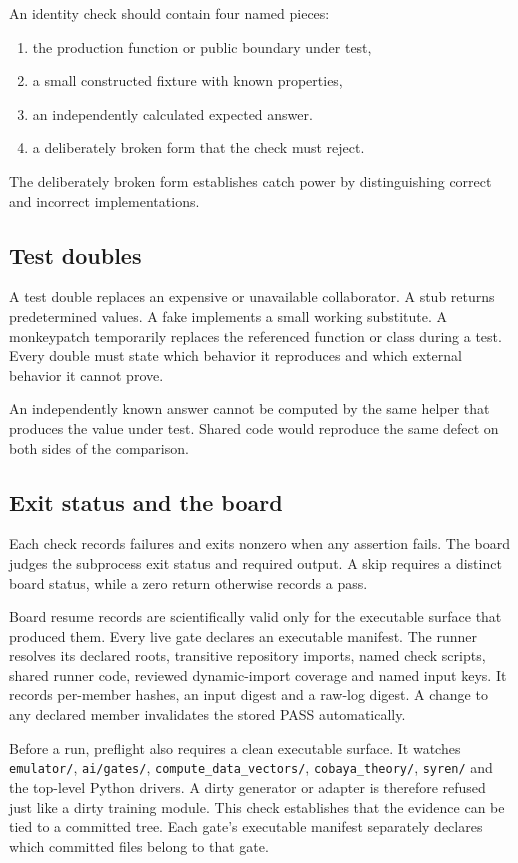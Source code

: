 \documentclass[10pt,aps,prd,twocolumn,nofootinbib]{revtex4-2}
\newcommand{\code}[1]{\texttt{#1}}
\begin{document}
An identity check should contain four named pieces:
\begin{enumerate}
  \item the production function or public boundary under test,
  \item a small constructed fixture with known properties,
  \item an independently calculated expected answer.
  \item a deliberately broken form that the check must reject.
\end{enumerate}

The deliberately broken form establishes catch power by distinguishing correct
and incorrect implementations.

\subsection{Test doubles}

A test double replaces an expensive or unavailable collaborator.  A stub
returns predetermined values.  A fake implements a small working substitute.
A monkeypatch temporarily replaces the referenced function or class during a
test.  Every double must state which behavior it reproduces and which external
behavior it cannot prove.

An independently known answer cannot be computed by the same helper that
produces the value under test.  Shared code would reproduce the same defect on
both sides of the comparison.

\subsection{Exit status and the board}

Each check records failures and exits nonzero when any assertion fails.  The
board judges the subprocess exit status and required output.  A skip requires a
distinct board status, while a zero return otherwise records a pass.

Board resume records are scientifically valid only for the executable surface
that produced them.  Every live gate declares an executable manifest.  The
runner resolves its declared roots, transitive repository imports, named check
scripts, shared runner code, reviewed dynamic-import coverage and named input
keys.  It records per-member hashes, an input digest and a raw-log digest.  A
change to any declared member invalidates the stored PASS automatically.

Before a run, preflight also requires a clean executable surface.  It watches
\code{emulator/}, \code{ai/gates/}, \code{compute\_data\_vectors/},
\code{cobaya\_theory/}, \code{syren/} and the top-level Python drivers.  A
dirty generator or adapter is therefore refused just like a dirty training
module.  This check establishes that the evidence can be tied to a committed
tree.  Each gate's executable manifest separately declares which committed
files belong to that gate.
\end{document}
